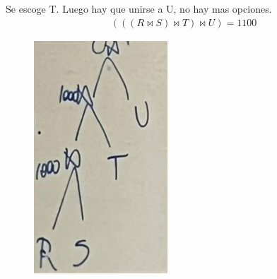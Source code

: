 \documentclass{templateNote}
\begin{document}
\begin{enumerate}
\begin{enumerate}[label=\alph*)]
\begin{enumerate}[label=\alph*)]
            Se escoge T. Luego hay que unirse a U, no hay mas opciones.
            \begin{align*}
                (((R \Join S)\Join T)\Join U) = 1100
            \end{align*}

            \begin{figure}[H]
                \centering
                \includegraphics[width=5cm]{img/Imagen de WhatsApp 2024-07-08 a las 15.29.34_080aad61.jpg}
            \end{figure}

        \end{enumerate}


    \end{enumerate}
\end{enumerate}
\end{document}
